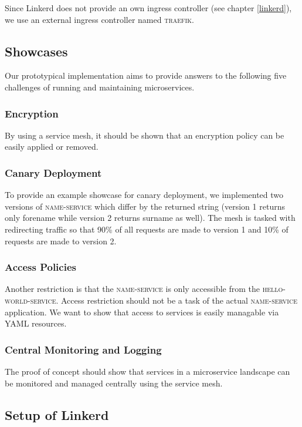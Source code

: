 Since Linkerd does not provide an own ingress controller (see chapter \ref{linkerd}), we use an external ingress controller named \textsc{traefik}.

\subsection{Showcases}
\label{sec:showcases-1}

Our prototypical implementation aims to provide answers to the following five challenges of running and maintaining microservices.

\subsubsection{Encryption}

By using a service mesh, it should be shown that an encryption policy can be easily applied or removed.

\subsubsection{Canary Deployment}

To provide an example showcase for canary deployment, we implemented two versions of \textsc{name-service} which differ by the returned string (version 1 returns only forename while version 2 returns surname as well).
The mesh is tasked with redirecting traffic so that 90\% of all requests are made to version 1 and 10\% of requests are made to version 2.

\subsubsection{Access Policies}

Another restriction is that the \textsc{name-service} is only accessible from the \textsc{hello-world-service}. Access restriction should not be a task of the actual \textsc{name-service} application. We want to show that access to services is easily managable via YAML resources.

\subsubsection{Central Monitoring and Logging}
The proof of concept should show that services in a microservice landscape can be monitored and managed centrally using the service mesh.

\subsection{Setup of Linkerd}

